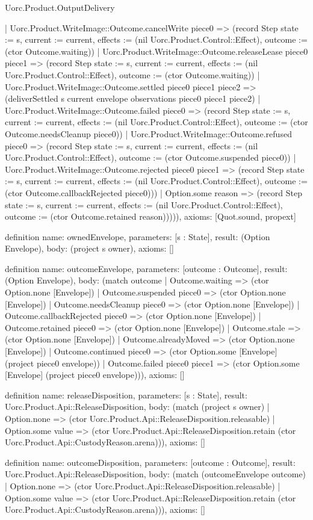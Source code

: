 \begin{lexlean}{Uorc.Product.OutputDelivery}
\begin{semanticmodule}
{        | Uorc.Product.WriteImage::Outcome.cancelWrite piece0 => (record Step {state := s, current := current, effects := (nil Uorc.Product.Control::Effect), outcome := (ctor Outcome.waiting)})
        | Uorc.Product.WriteImage::Outcome.releaseLease piece0 piece1 => (record Step {state := s, current := current, effects := (nil Uorc.Product.Control::Effect), outcome := (ctor Outcome.waiting)})
        | Uorc.Product.WriteImage::Outcome.settled piece0 piece1 piece2 => (deliverSettled s current envelope observations piece0 piece1 piece2)
        | Uorc.Product.WriteImage::Outcome.failed piece0 => (record Step {state := s, current := current, effects := (nil Uorc.Product.Control::Effect), outcome := (ctor Outcome.needsCleanup piece0)})
        | Uorc.Product.WriteImage::Outcome.refused piece0 => (record Step {state := s, current := current, effects := (nil Uorc.Product.Control::Effect), outcome := (ctor Outcome.suspended piece0)})
        | Uorc.Product.WriteImage::Outcome.rejected piece0 piece1 => (record Step {state := s, current := current, effects := (nil Uorc.Product.Control::Effect), outcome := (ctor Outcome.callbackRejected piece0)}))
      | Option.some reason => (record Step {state := s, current := current, effects := (nil Uorc.Product.Control::Effect), outcome := (ctor Outcome.retained reason)})))),
  axioms: [Quot.sound, propext]
}

definition{
  name: ownedEnvelope,
  parameters: [s : State],
  result: (Option Envelope),
  body: (project s owner),
  axioms: []
}

definition{
  name: outcomeEnvelope,
  parameters: [outcome : Outcome],
  result: (Option Envelope),
  body: (match outcome
    | Outcome.waiting => (ctor Option.none [Envelope])
    | Outcome.suspended piece0 => (ctor Option.none [Envelope])
    | Outcome.needsCleanup piece0 => (ctor Option.none [Envelope])
    | Outcome.callbackRejected piece0 => (ctor Option.none [Envelope])
    | Outcome.retained piece0 => (ctor Option.none [Envelope])
    | Outcome.stale => (ctor Option.none [Envelope])
    | Outcome.alreadyMoved => (ctor Option.none [Envelope])
    | Outcome.continued piece0 => (ctor Option.some [Envelope] (project piece0 envelope))
    | Outcome.failed piece0 piece1 => (ctor Option.some [Envelope] (project piece0 envelope))),
  axioms: []
}

definition{
  name: releaseDisposition,
  parameters: [s : State],
  result: Uorc.Product.Api::ReleaseDisposition,
  body: (match (project s owner)
    | Option.none => (ctor Uorc.Product.Api::ReleaseDisposition.releasable)
    | Option.some value => (ctor Uorc.Product.Api::ReleaseDisposition.retain (ctor Uorc.Product.Api::CustodyReason.arena))),
  axioms: []
}

definition{
  name: outcomeDisposition,
  parameters: [outcome : Outcome],
  result: Uorc.Product.Api::ReleaseDisposition,
  body: (match (outcomeEnvelope outcome)
    | Option.none => (ctor Uorc.Product.Api::ReleaseDisposition.releasable)
    | Option.some value => (ctor Uorc.Product.Api::ReleaseDisposition.retain (ctor Uorc.Product.Api::CustodyReason.arena))),
  axioms: []
}
\end{semanticmodule}
\end{lexlean}
